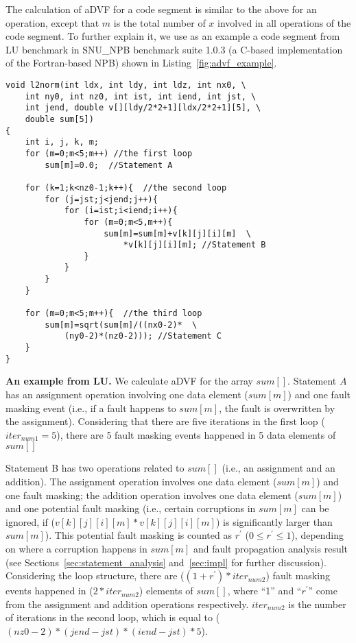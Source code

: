The calculation of aDVF for a code segment is similar to the above for an operation, except that
$m$ is the total number of $x$
involved in all %
operations of the code segment. 
To further explain it, we use as an example
a code segment from LU benchmark in SNU\_NPB benchmark suite 1.0.3 (a C-based implementation of the Fortran-based NPB) shown in 
Listing~\ref{fig:advf_example}.

\begin{lstlisting}[label={fig:advf_example}, caption={A code segment from LU.}]
void l2norm(int ldx, int ldy, int ldz, int nx0, \
	int ny0, int nz0, int ist, int iend, int jst, \
    int jend, double v[][ldy/2*2+1][ldx/2*2+1][5], \
    double sum[5])
{
	int i, j, k, m;
    for (m=0;m<5;m++) //the first loop
    	sum[m]=0.0;  //Statement A
    
    for (k=1;k<nz0-1;k++){  //the second loop
    	for (j=jst;j<jend;j++){
        	for (i=ist;i<iend;i++){
            	for (m=0;m<5,m++){
            		sum[m]=sum[m]+v[k][j][i][m]  \
                    	*v[k][j][i][m]; //Statement B
                }
            }
        }
    }
    
    for (m=0;m<5;m++){  //the third loop
    	sum[m]=sqrt(sum[m]/((nx0-2)*  \
        	(ny0-2)*(nz0-2))); //Statement C
    }
} 
\end{lstlisting}


\textbf{An example from LU.} We calculate aDVF for the array $sum[]$. 
Statement $A$ has an assignment operation involving one data element ($sum[m]$) and one fault masking event (i.e., if a fault happens to $sum[m]$, the fault is overwritten by the assignment). Considering that there are five iterations in the first loop ($iter_{num1} = 5$), there are 5 fault masking events happened in 5 data elements of $sum[]$

Statement B has two operations related to $sum[]$ (i.e., an assignment and an addition). The assignment operation involves one data element ($sum[m]$) and one fault masking; the addition operation involves one data element ($sum[m]$) and one potential fault masking (i.e., certain corruptions in $sum[m]$ can be ignored, if ($v[k][j][i][m]*v[k][j][i][m]$) is significantly larger than $sum[m]$). This potential fault masking is counted as $r^\prime$ ($0 \leq r^\prime \leq 1$), depending on where a corruption happens in $sum[m]$ and fault propagation analysis result (see Sections~\ref{sec:statement_analysis} and~\ref{sec:impl} for further discussion). 
Considering the loop structure, there are ($(1+r^\prime) * iter_{num2}$) fault masking events happened in ($2 * iter_{num2}$) elements of $sum[]$, where ``1'' and ``$r^\prime$'' come from the assignment and addition operations respectively. $iter_{num2}$ is the number of iterations in the second loop, which is equal to ($(nz0-2)*(jend-jst)*(iend-jst)*5$).

